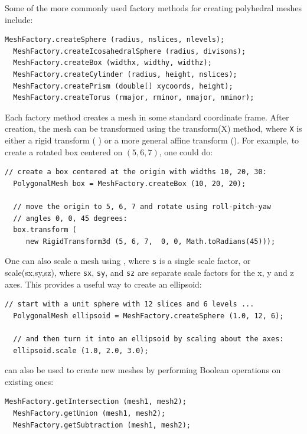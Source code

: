 Some of the more commonly used factory methods for creating polyhedral
meshes include:
%
\begin{lstlisting}[]
  MeshFactory.createSphere (radius, nslices, nlevels);
  MeshFactory.createIcosahedralSphere (radius, divisons);
  MeshFactory.createBox (widthx, widthy, widthz);
  MeshFactory.createCylinder (radius, height, nslices);
  MeshFactory.createPrism (double[] xycoords, height);
  MeshFactory.createTorus (rmajor, rminor, nmajor, nminor);
\end{lstlisting}
%
Each factory method creates a mesh in some standard coordinate
frame. After creation, the mesh can be transformed using the
%
{transform(X)} method, where {\tt X} is either a rigid transform (
) or a more general affine
transform ().
For example, to create a rotated box centered on $(5, 6, 7)$,
one could do:
%
\begin{lstlisting}[]
  // create a box centered at the origin with widths 10, 20, 30:
  PolygonalMesh box = MeshFactory.createBox (10, 20, 20);

  // move the origin to 5, 6, 7 and rotate using roll-pitch-yaw
  // angles 0, 0, 45 degrees:
  box.transform (
     new RigidTransform3d (5, 6, 7,  0, 0, Math.toRadians(45)));
\end{lstlisting}
%
One can also scale a mesh using
,
where {\tt s} is a single scale factor, or
%
{scale(sx,sy,sz)}, where {\tt sx}, {\tt sy}, and {\tt sz} are separate
scale factors for the x, y and z axes. This provides a useful way to
create an ellipsoid:
%
\begin{lstlisting}[]
   // start with a unit sphere with 12 slices and 6 levels ...
  PolygonalMesh ellipsoid = MeshFactory.createSphere (1.0, 12, 6);

  // and then turn it into an ellipsoid by scaling about the axes:
  ellipsoid.scale (1.0, 2.0, 3.0);
\end{lstlisting}
%
 can also be used to create
new meshes by performing Boolean operations on existing ones:
%
\begin{lstlisting}[]
  MeshFactory.getIntersection (mesh1, mesh2);
  MeshFactory.getUnion (mesh1, mesh2);
  MeshFactory.getSubtraction (mesh1, mesh2);
\end{lstlisting}
%

